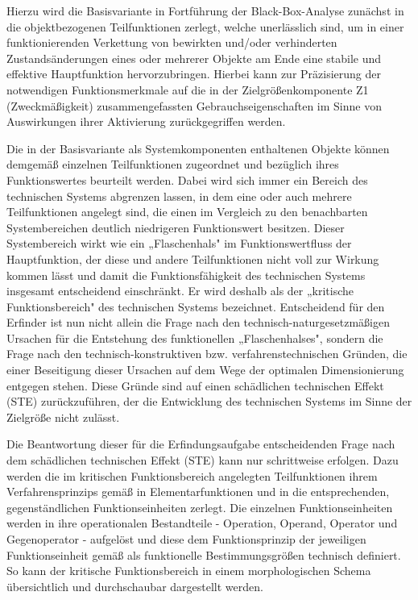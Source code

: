 \documentclass[12pt,a4paper]{article}
\begin{document}
Hierzu wird die Basisvariante in Fortführung der Black-Box-Analyse zunächst in die objektbezogenen Teilfunktionen zerlegt, welche unerlässlich sind, um in einer funktionierenden Verkettung von bewirkten und/oder verhinderten Zustandsänderungen eines oder mehrerer Objekte am Ende eine stabile und effektive Hauptfunktion hervorzubringen. Hierbei kann zur Präzisierung der notwendigen Funktionsmerkmale auf die in der Zielgrößenkomponente Z1 (Zweckmäßigkeit) zusammengefassten Gebrauchseigenschaften im Sinne von Auswirkungen ihrer Aktivierung zurückgegriffen werden.

Die in der Basisvariante als Systemkomponenten enthaltenen Objekte können demgemäß einzelnen Teilfunktionen zugeordnet und bezüglich ihres Funktionswertes beurteilt werden. Dabei wird sich immer ein Bereich des technischen Systems abgrenzen lassen, in dem eine oder auch mehrere Teilfunktionen angelegt sind, die einen im Vergleich zu den benachbarten Systembereichen deutlich niedrigeren Funktionswert besitzen. Dieser Systembereich wirkt wie ein „Flaschenhals" im Funktionswertfluss der Hauptfunktion, der diese und andere Teilfunktionen nicht voll zur Wirkung kommen lässt und damit die Funktionsfähigkeit des technischen Systems insgesamt entscheidend ein­schränkt. Er wird deshalb als der „kritische Funktionsbereich" des technischen Systems bezeichnet. Entscheidend für den Erfinder ist nun nicht allein die Frage nach den technisch-naturgesetzmäßigen Ursachen für die Entstehung des funktionellen „Flaschenhalses", sondern die Frage nach den technisch-konstruktiven bzw. verfahrens­technischen Gründen, die einer Beseitigung dieser Ursachen auf dem Wege der optimalen Dimensionierung entgegen stehen. Diese Gründe sind auf einen schädlichen technischen Effekt (STE) zurückzuführen, der die Entwicklung des technischen Systems im Sinne der Zielgröße nicht zulässt.

Die Beantwortung dieser für die Erfindungsaufgabe entscheidenden Frage nach dem schädlichen technischen Effekt (STE) kann nur schrittweise erfolgen. Dazu werden die im kritischen Funktionsbereich angelegten Teilfunktionen ihrem Verfahrensprinzips gemäß in Elementarfunktionen und in die entsprechenden, gegenständlichen Funktionseinheiten zerlegt. Die einzelnen Funktionseinheiten werden in ihre operationalen Bestandteile - Operation, Operand, Operator und Gegenoperator - aufgelöst und diese dem Funktionsprinzip der jeweiligen Funktionseinheit gemäß als funktionelle Bestimmungs­größen technisch definiert. So kann der kritische Funktionsbereich in einem morphologischen Schema übersichtlich und durchschaubar dargestellt werden.
\end{document}
